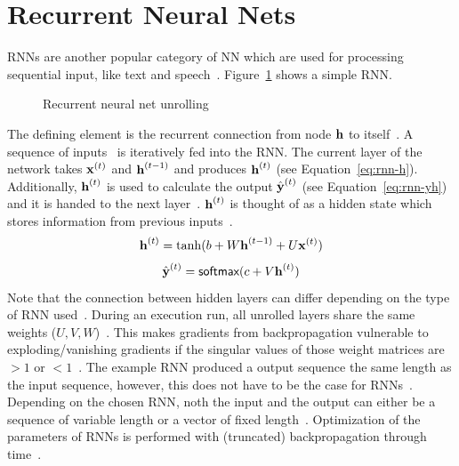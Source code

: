 \section{Recurrent Neural Nets}
\acp{RNN} are another popular category of \ac{NN} which are used for processing sequential input,
like text and speech~\citep{chauhan_review_2018}.
Figure~\ref{fig:rnn-unrolling} shows a simple \ac{RNN}.
\begin{figure}[ht]
    \centering
    \caption[Simple recurrent neural net]{%
        Recurrent neural net unrolling~\citep{goodfellow_deep_2016}\label{fig:rnn-unrolling}
    }
\end{figure}
The defining element is the recurrent connection from node $\textbf{h}$ to
itself~\citep{goodfellow_deep_2016}.
A sequence of inputs \X\ is iteratively fed into the \ac{RNN}.
The current layer of the network takes $\textbf{x}^{(t)}$ and $\textbf{h}^{(t-1)}$ and produces $\textbf{h}^{(t)}$
(see Equation~\ref{eq:rnn-h}).
Additionally, $\textbf{h}^{(t)}$ is used to calculate the output $\hat{\textbf{y}}^{(t)}$ (see
Equation~\ref{eq:rnn-yh})
and it is handed to the next layer~\citep{goodfellow_deep_2016}.
$\textbf{h}^{(t)}$ is thought of as a hidden state which stores information from previous
inputs~\citep{goodfellow_deep_2016}.
\begin{equation}\label{eq:rnn-h}
    \textbf{h}^{(t)} = \tanh(b+W\textbf{h}^{(t-1)}+U\textbf{x}^{(t)})
\end{equation}
\begin{equation}\label{eq:rnn-yh}
    \hat{\textbf{y}}^{(t)} = \textsf{softmax}(c + V\textbf{h}^{(t)})
\end{equation}
Note that the connection between hidden layers can differ depending on the type of \ac{RNN}
used~\citep{goodfellow_deep_2016}.
During an execution run, all unrolled layers share the same weights
($U,V,W$)~\citep{chauhan_review_2018}.
This makes gradients from backpropagation vulnerable to exploding/vanishing gradients if the
singular values of those weight matrices are $>1$ or
$<1$~\citep{goodfellow_deep_2016,pascanu_difficulty_2013}.
The example \ac{RNN} produced a output sequence the same length as the input
sequence, however, this does not have to be the case for \acp{RNN}~\citep{goodfellow_deep_2016}.
Depending on the chosen \ac{RNN}, noth the input and the output can either be a sequence of
variable length or a vector of fixed length~\citep{goodfellow_deep_2016}.
Optimization of the parameters of \acp{RNN} is performed with (truncated) backpropagation through
time~\citep{sherstinsky_fundamentals_2020}.

